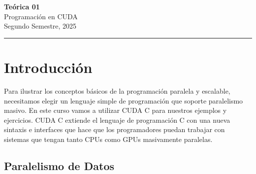 



\begin{center}
    \LARGE\textbf{Teórica 01} \\
    \Large{Programación en CUDA} \\
    \normalsize{Segundo Semestre, 2025} \\
    \vspace{1em}
    \hrule
\end{center}

\vspace{1em}


\section*{Introducción}

Para ilustrar los conceptos básicos de la programación paralela y escalable, necesitamos elegir un lenguaje simple de
programación que soporte paralelismo masivo. En este curso vamos a utilizar CUDA C para nuestros ejemplos y ejercicios.
CUDA C extiende el lenguaje de programación C con una nueva sintaxis e interfaces que hace que los programadores puedan
trabajar con sistemas que tengan tanto CPUs como GPUs masivamente paralelas.

\subsection*{Paralelismo de Datos}

